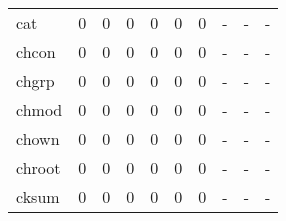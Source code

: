 \begin{longtable}{lp{2.0cm}p{2.0cm}p{2.0cm}p{2.0cm}p{2.0cm}p{2.0cm}p{2.0cm}p{2.0cm}p{2.0cm}}
cat       &                      0 &                                             0 &                                            0 &                                           0 &                                            0 &                                          0 &                                    - &                                      - &                                    - \\
chcon     &                      0 &                                             0 &                                            0 &                                           0 &                                            0 &                                          0 &                                    - &                                      - &                                    - \\
chgrp     &                      0 &                                             0 &                                            0 &                                           0 &                                            0 &                                          0 &                                    - &                                      - &                                    - \\
chmod     &                      0 &                                             0 &                                            0 &                                           0 &                                            0 &                                          0 &                                    - &                                      - &                                    - \\
chown     &                      0 &                                             0 &                                            0 &                                           0 &                                            0 &                                          0 &                                    - &                                      - &                                    - \\
chroot    &                      0 &                                             0 &                                            0 &                                           0 &                                            0 &                                          0 &                                    - &                                      - &                                    - \\
cksum     &                      0 &                                             0 &                                            0 &                                           0 &                                            0 &                                          0 &                                    - &                                      - &                                    - \\

\end{longtable}
